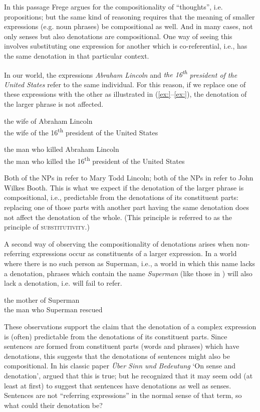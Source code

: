 In this passage Frege argues for the compositionality of “thoughts”, i.e. propositions; but the same kind of reasoning requires that the meaning of smaller expressions (e.g. noun phrases) be compositional as well. And in many cases, not only senses but also denotations are compositional. One way of seeing this involves substituting one expression for another which is co-referential, i.e., has the same denotation in that particular context.



In our world, the expressions \textit{Abraham Lincoln} and \textit{the 16\textsuperscript{th}} \textit{president of the United States} refer to the same individual. For this reason, if we replace one of these expressions with the other as illustrated in (\ref{ex:}--\ref{ex:}), the denotation of the larger phrase is not affected.


\ea
\ea the wife of Abraham Lincoln\\
\ex the wife of the 16\textsuperscript{th} president of the United States
                       \z
\z

\ea
\ea the man who killed Abraham Lincoln\\
\ex the man who killed the 16\textsuperscript{th} president of the United States
                       \z
\z


Both of the NPs in  refer to Mary Todd Lincoln; both of the NPs in  refer to John Wilkes Booth. This is what we expect if the denotation of the larger phrase is compositional, i.e., predictable from the denotations of its constituent parts: replacing one of those parts with another part having the same denotation does not affect the denotation of the whole. (This principle is referred to as the principle of \textsc{substitutivity}.)



A second way of observing the compositionality of denotations arises when non-referring expressions occur as constituents of a larger expression. In a world where there is no such person as Superman, i.e., a world in which this name lacks a denotation, phrases which contain the name \textit{Superman} (like those in ) will also lack a denotation, i.e. will fail to refer.


\ea
\ea the mother of Superman\\
\ex the man who Superman rescued
                       \z
\z


These observations support the claim that the denotation of a complex expression is (often) predictable from the denotations of its constituent parts. Since sentences are formed from constituent parts (words and phrases) which have denotations, this suggests that the denotations of sentences might also be compositional. In his classic paper \textit{Über Sinn und Bedeutung} ‘On sense and denotation’, \citet{Frege1892} argued that this is true; but he recognized that it may seem odd (at least at first) to suggest that sentences have denotations as well as senses. Sentences are not “referring expressions” in the normal sense of that term, so what could their denotation be?



